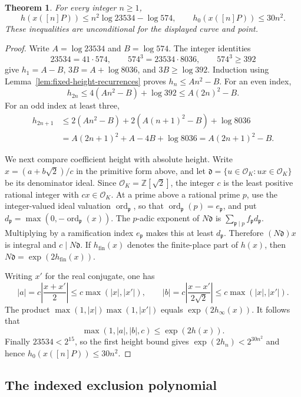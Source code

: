 \documentclass[11pt,a4paper]{article}
\newtheorem{theorem}{Theorem}[section]
\begin{document}
\begin{theorem}\label{thm:fixed-height-quadratic}
For every integer $n\ge1$,
\[
 h(x([n]P))\le n^2\log23534-\log574,
 \qquad h_0(x([n]P))\le30n^2.
\]
These inequalities are unconditional for the displayed curve and point.
\end{theorem}
\begin{proof}
Write $A=\log23534$ and $B=\log574$. The integer identities
\[
 23534=41\cdot574,\qquad
 574^3=23534\cdot8036,\qquad574^3\ge392
\]
give $h_1=A-B$, $3B=A+\log8036$, and $3B\ge\log392$.
Induction using Lemma~\ref{lem:fixed-height-recurrences} proves
$h_n\le An^2-B$. For an even index,
\[
 h_{2n}\le4(An^2-B)+\log392\le A(2n)^2-B.
\]
For an odd index at least three,
\[
 \begin{split}
 h_{2n+1}&\le2(An^2-B)+2(A(n+1)^2-B)+\log8036\\
 &=A(2n+1)^2+A-4B+\log8036
  =A(2n+1)^2-B.
 \end{split}
\]

We next compare coefficient height with absolute height. Write
$x=(a+b\sqrt2)/c$ in the primitive form above, and let
$\mathfrak d=\{u\in\mathcal O_K:ux\in\mathcal O_K\}$ be its
denominator ideal. Since $\mathcal O_K=\mathbb Z[\sqrt2]$, the
integer $c$ is the least positive rational integer with
$cx\in\mathcal O_K$. At a prime above a rational prime $p$, use the integer-valued ideal
valuation $\operatorname{ord}_{\mathfrak p}$, so that
$\operatorname{ord}_{\mathfrak p}(p)=e_{\mathfrak p}$, and put
$d_{\mathfrak p}=\max(0,-\operatorname{ord}_{\mathfrak p}(x))$.
The $p$-adic exponent of $N\mathfrak d$ is
$\sum_{\mathfrak p\mid p}f_{\mathfrak p}d_{\mathfrak p}$.
Multiplying by a ramification index $e_{\mathfrak p}$ makes this
at least $d_{\mathfrak p}$. Therefore
$(N\mathfrak d)x$ is integral and $c\mid N\mathfrak d$.
If $h_{\mathrm{fin}}(x)$ denotes the finite-place part of $h(x)$,
then $N\mathfrak d=\exp(2h_{\mathrm{fin}}(x))$.

Writing $x'$ for the real conjugate, one has
\[
 |a|=c\left|\frac{x+x'}2\right|\le c\max(|x|,|x'|),\qquad
 |b|=c\left|\frac{x-x'}{2\sqrt2}\right|
                         \le c\max(|x|,|x'|).
\]
The product $\max(1,|x|)\max(1,|x'|)$ equals
$\exp(2h_{\infty}(x))$. It follows that
\[
                  \max(1,|a|,|b|,c)\le\exp(2h(x)).
\]
Finally $23534<2^{15}$, so the first height bound gives
$\exp(2h_n)<2^{30n^2}$ and hence $h_0(x([n]P))\le30n^2$.
\end{proof}

\subsection{The indexed exclusion polynomial}
\end{document}
